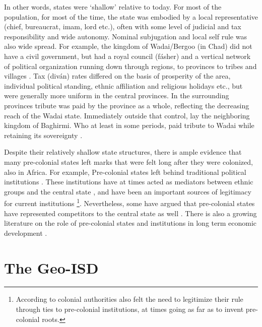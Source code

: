 \documentclass[12pt]{article}
\begin{document}

In other words, states were `shallow' relative to today. For most of the
population, for most of the time, the state was embodied by a local
representative (chief, bureaucrat, imam, lord etc.), often with some level of
judicial and tax responsibility and wide autonomy. Nominal subjugation and local
self rule was also wide spread. For example, the kingdom of Wadai/Bergoo (in
Chad) did not have a civil government, but had a royal council (fásher) and a
vertical network of political organization running down through regions, to
provinces to tribes and villages \citep{barth1857travels}. Tax (diván) rates
differed on the basis of prosperity of the area, individual political standing,
ethnic affiliation and religious holidays etc., but were generally more uniform
in the central provinces. In the surrounding provinces tribute was paid by the
province as a whole, reflecting the decreasing reach of the Wadai state.
Immediately outside that control, lay the neighboring kingdom of Baghirmi. Who
at least in some periods, paid tribute to Wadai while retaining its sovereignty
\citep{barth1857travels}.

Despite their relatively shallow state structures, there is ample evidence that
many pre-colonial states left marks that were felt long after they were
colonized, also in Africa. For example, Pre-colonial states left behind
traditional political institutions \citep{Beall_2005, Holzinger_2020,
Neupert_Wentz_2021, Ubink_2008}. These institutions have at times acted as
mediators between ethnic groups and the central state \citep{boone2014property,
Englebert2002}, and have been an important sources of legitimacy for current
institutions \citep{Wig2016}\footnote{According to \citet{mamdani2018citizen}
	colonial authorities also felt the need to legitimize their rule through
	ties to pre-colonial institutions, at times going as far as to invent
pre-colonial roots.}. Nevertheless, some have argued that pre-colonial states
have represented competitors to the central state as well \citep{Herbst2014}.
There is also a growing literature on the role of pre-colonial states and
institutions in long term economic development \citep{Michalopoulos2018,
Acemoglu2014, Gennaioli2007, Bockstette2002, Wilfahrt_2021}.

\section{The Geo-ISD}
\end{document}

